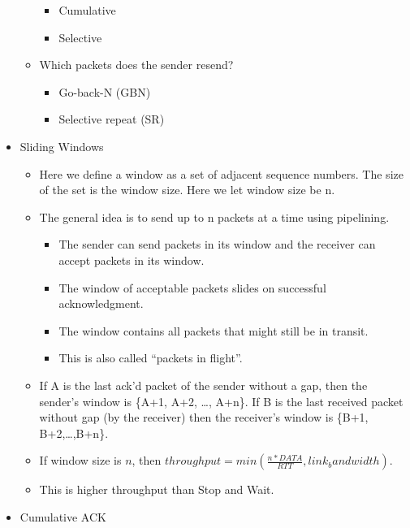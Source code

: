\begin{itemize}
\begin{itemize}
    \begin{itemize}
    \tightlist
    \item
      Cumulative
    \item
      Selective
    \end{itemize}
  \item
    Which packets does the sender resend?

    \begin{itemize}
    \tightlist
    \item
      Go-back-N (GBN)
    \item
      Selective repeat (SR)
    \end{itemize}
  \end{itemize}
\item
  Sliding Windows

  \begin{itemize}
  \tightlist
  \item
    Here we define a window as a set of adjacent sequence numbers. The
    size of the set is the window size. Here we let window size be n.
  \item
    The general idea is to send up to n packets at a time using
    pipelining.

    \begin{itemize}
    \tightlist
    \item
      The sender can send packets in its window and the receiver can
      accept packets in its window.
    \item
      The window of acceptable packets slides on successful
      acknowledgment.
    \item
      The window contains all packets that might still be in transit.
    \item
      This is also called ``packets in flight''.
    \end{itemize}
  \item
    If A is the last ack'd packet of the sender without a gap, then the
    sender's window is \{A+1, A+2, \ldots{}, A+n\}. If B is the last
    received packet without gap (by the receiver) then the receiver's
    window is \{B+1, B+2,\ldots{},B+n\}.
  \item
    If window size is \(n\), then
    \(throughput = min(\frac{n * DATA}{RTT},  link_bandwidth)\).
  \item
    This is higher throughput than Stop and Wait.
  \end{itemize}
\item
  Cumulative ACK


\end{itemize}
